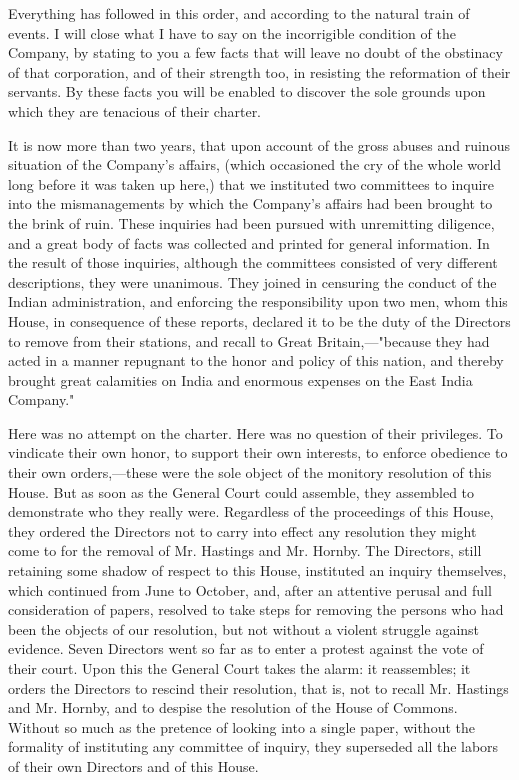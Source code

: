 Everything has followed in this order, and according to the natural train of events. I will close what I have to say on the incorrigible condition of the Company, by stating to you a few facts that will leave no doubt of the obstinacy of that corporation, and of their strength too, in resisting the reformation of their servants. By these facts you will be enabled to discover the sole grounds upon which they are tenacious of their charter.

It is now more than two years, that upon account of the gross abuses and ruinous situation of the Company's affairs, (which occasioned the cry of the whole world long before it was taken up here,) that we instituted two committees to inquire into the mismanagements by which the Company's affairs had been brought to the brink of ruin. These inquiries had been pursued with unremitting diligence, and a great body of facts was collected and printed for general information. In the result of those inquiries, although the committees consisted of very different descriptions, they were unanimous. They joined in censuring the conduct of the Indian administration, and enforcing the responsibility upon two men, whom this House, in consequence of these reports, declared it to be the duty of the Directors to remove from their stations, and recall to Great Britain,—"because they had acted in a manner repugnant to the honor and policy of this nation, and thereby brought great calamities on India and enormous expenses on the East India Company."

Here was no attempt on the charter. Here was no question of their privileges. To vindicate their own honor, to support their own interests, to enforce obedience to their own orders,—these were the sole object of the monitory resolution of this House. But as soon as the General Court could assemble, they assembled to demonstrate who they really were. Regardless of the proceedings of this House, they ordered the Directors not to carry into effect any resolution they might come to for the removal of Mr. Hastings and Mr. Hornby. The Directors, still retaining some shadow of respect to this House, instituted an inquiry themselves, which continued from June to October, and, after an attentive perusal and full consideration of papers, resolved to take steps for removing the persons who had been the objects of our resolution, but not without a violent struggle against evidence. Seven Directors went so far as to enter a protest against the vote of their court. Upon this the General Court takes the alarm: it reassembles; it orders the Directors to rescind their resolution, that is, not to recall Mr. Hastings and Mr. Hornby, and to despise the resolution of the House of Commons. Without so much as the pretence of looking into a single paper, without the formality of instituting any committee of inquiry, they superseded all the labors of their own Directors and of this House.

